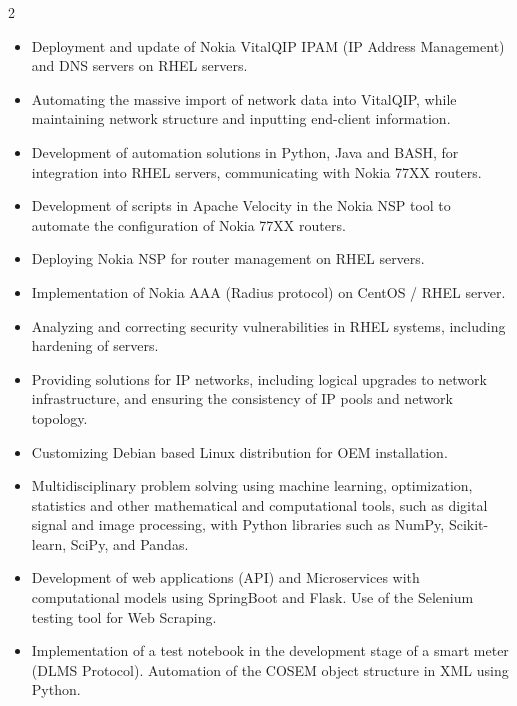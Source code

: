 \documentclass[10pt,a4paper,ragged2e,withhyper]{altacv}
\begin{document}
\begin{paracol}{2}
\begin{itemize}
    \item Deployment and update of Nokia VitalQIP IPAM (IP Address Management) and DNS servers on RHEL servers.
    
    \item Automating the massive import of network data into VitalQIP, while maintaining network structure and inputting end-client information.
    
    \item Development of automation solutions in Python, Java and BASH, for integration into RHEL servers, communicating with Nokia 77XX routers.
    
    \item Development of scripts in Apache Velocity in the Nokia NSP tool to automate the configuration of Nokia 77XX routers.
    
    \item Deploying Nokia NSP for router management on RHEL servers.
    
    \item Implementation of Nokia AAA (Radius protocol) on CentOS / RHEL server.
    
    \item Analyzing and correcting security vulnerabilities in RHEL systems, including hardening of servers.
    
    \item Providing solutions for IP networks, including logical upgrades to network infrastructure, and ensuring the consistency of IP pools and network topology.
    
    \item Customizing Debian based Linux distribution for OEM installation.
    
    \item Multidisciplinary problem solving using machine learning, optimization, statistics and other mathematical and computational tools, such as digital signal and image processing, with Python libraries such as NumPy, Scikit-learn, SciPy, and Pandas.
    
    \item Development of web applications (API) and Microservices with computational models using SpringBoot and Flask. Use of the Selenium testing tool for Web Scraping.
    
    \item Implementation of a test notebook in the development stage of a smart meter (DLMS Protocol). Automation of the COSEM object structure in XML using Python.
    

\end{itemize}
\end{paracol}
\end{document}
